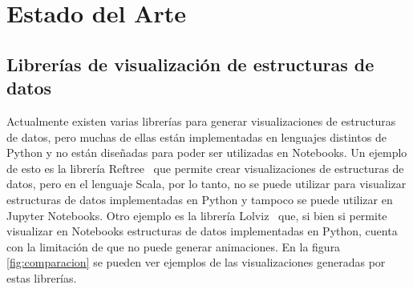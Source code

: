 \chapter{Estado del Arte}

\section{Librerías de visualización de estructuras de datos}

Actualmente existen varias librerías para generar visualizaciones de estructuras de datos, pero muchas de ellas están implementadas en lenguajes distintos de Python y no están diseñadas para poder ser utilizadas en Notebooks.
Un ejemplo de esto es la librería Reftree~\cite{Stanch2021} que permite crear visualizaciones de estructuras de datos, pero en el lenguaje Scala, por lo tanto, no se puede utilizar para visualizar estructuras de datos implementadas en Python y tampoco se puede utilizar en Jupyter Notebooks.
Otro ejemplo es la librería Lolviz~\cite{Lolviz} que, si bien si permite visualizar en Notebooks estructuras de datos implementadas en Python, cuenta con la limitación de que no puede generar animaciones. En la figura \ref{fig:comparacion} se pueden ver ejemplos de las visualizaciones generadas por estas librerías.

